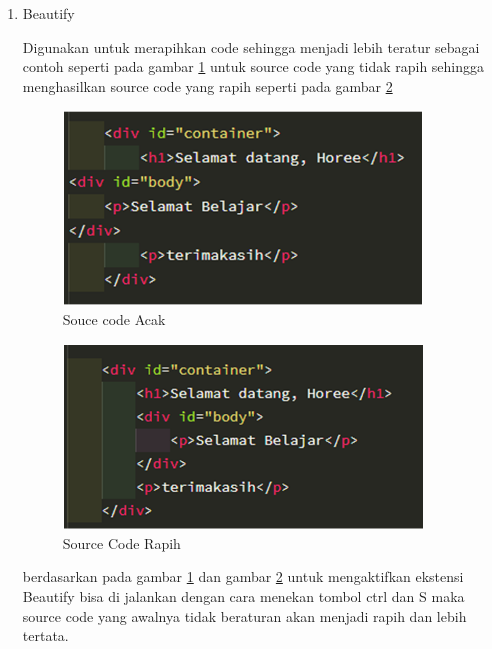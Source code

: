 \begin{enumerate}
\item Beautify\par
Digunakan untuk merapihkan code sehingga menjadi lebih teratur sebagai contoh seperti pada gambar \ref{V16} untuk source code yang tidak rapih sehingga menghasilkan source code yang rapih seperti pada gambar \ref{V17} 
 

\begin{figure}[!htbp]
	\centerline{\includegraphics[width=0.90\textwidth]{figures/vs/16.png}}
	\caption{Souce code Acak}
	\label{V16}
\end{figure}

\begin{figure}[!htbp]
	\centerline{\includegraphics[width=0.90\textwidth]{figures/vs/17.png}}
	\caption{Source Code Rapih}
	\label{V17}
\end{figure}

berdasarkan pada gambar \ref{V16} dan gambar \ref{V17} untuk mengaktifkan ekstensi Beautify bisa di jalankan dengan cara menekan tombol ctrl dan S maka source code yang awalnya tidak beraturan akan menjadi rapih dan lebih tertata.



\end{enumerate}
